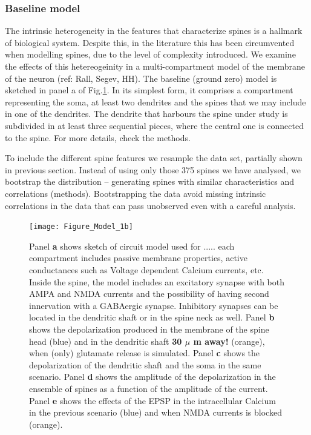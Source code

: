 \documentclass[10pt,letterpaper]{article}
\begin{document}
\newpage
\subsubsection*{Baseline model}

The intrinsic heterogeneity in the features that characterize spines is a hallmark of biological system. Despite this, in the literature this has been circumvented when modelling spines, due to the level of complexity introduced. We examine the effects of this hetereogeinity in a multi-compartment model of the membrane of the neuron (ref: Rall, Segev, HH). The baseline (ground zero) model is sketched in panel a of Fig.\ref{fig: base model }. In its simplest form, it comprises a compartment representing the soma, at least two dendrites and the spines that we may include in one of the dendrites. The dendrite that harbours the spine under study is subdivided in at least three sequential pieces, where the central one is connected to the spine. For more details, check the methods.

To include the different spine features we resample the data set, partially shown in previous section. Instead of using only those 375 spines we have analysed, we bootstrap the distribution -- generating spines with similar characteristics and correlations (methods). Bootstrapping the data avoid missing intrinsic correlations in the data that can pass unobserved even with a careful analysis. 


\begin{figure}[b!]
\texttt{[image: Figure\_Model\_1b]}
\caption{ Panel {\bf a} shows sketch of circuit model used for ..... each compartment includes passive membrane properties, active conductances such as Voltage dependent Calcium currents, etc. Inside the spine, the model includes an excitatory synapse with both AMPA and NMDA currents and the possibility of having second innervation with a GABAergic synapse. Inhibitory synapses can be located in the dendritic shaft or in the spine neck as well. Panel {\bf  b} shows the depolarization produced in the membrane of the spine head (blue) and in the dendritic shaft {\bf 30 $\mu$ m away!} (orange), when (only) glutamate release is simulated.  Panel {\bf c} shows the depolarization of the dendritic shaft and the soma in the same scenario. Panel {\bf d} shows the amplitude of the depolarization in the ensemble of spines as a function of the amplitude of the current. Panel {\bf e} shows the effects of the EPSP in the intracellular Calcium in the previous scenario (blue) and when NMDA currents is blocked (orange). \label{fig: base model }}
\end{figure}
\end{document}
